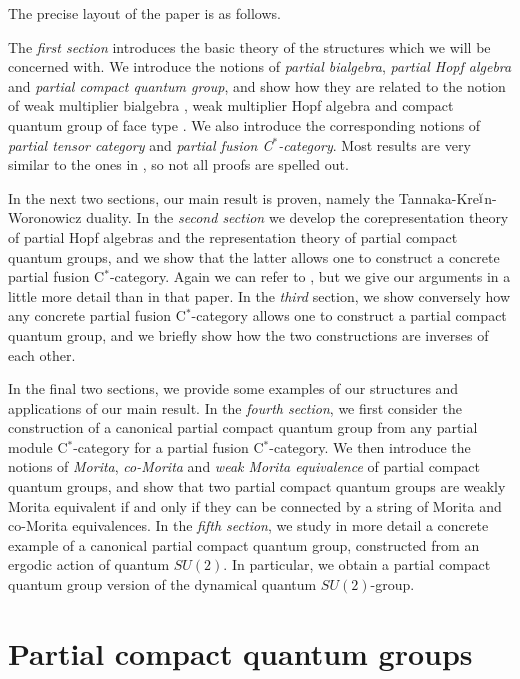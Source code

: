 \documentclass[10pt]{article}
\theoremstyle{definition}
\numberwithin{equation}{section}
\begin{document}
The precise layout of the paper is as follows.

The \emph{first section} introduces the basic theory of the structures which we will be concerned with. We introduce the notions of \emph{partial bialgebra}, \emph{partial Hopf algebra} and \emph{partial compact quantum group}, and show how they are related to the notion of weak multiplier bialgebra \cite{Boh1}, weak multiplier Hopf algebra \cite{VDW1,VDW2} and compact quantum group of face type \cite{Hay1}. We also introduce the corresponding notions of \emph{partial tensor category} and \emph{partial fusion C$^*$-category}. Most results are very similar to the ones in \cite{Hay1}, so not all proofs are spelled out.

In the next two sections, our main result is proven, namely the Tannaka-Kre$\breve{\textrm{\i}}$n-Woronowicz duality. In the \emph{second section} we develop the corepresentation theory of partial Hopf algebras and the representation theory of partial compact quantum groups, and we show that the latter allows one to construct a concrete partial fusion C$^*$-category. Again we can refer to \cite{Hay1}, but we give our arguments in a little more detail than in that paper. In the \emph{third} section, we show conversely how any concrete partial fusion C$^*$-category allows one to construct a partial compact quantum group, and we briefly show how the two constructions are inverses of each other.

In the final two sections, we provide some examples of our structures and applications of our main result. In the \emph{fourth section}, we first consider the construction of a canonical partial compact quantum group from any partial module C$^*$-category for a partial fusion C$^*$-category. We then introduce the notions of \emph{Morita}, \emph{co-Morita} and \emph{weak Morita equivalence} \cite{Mug1} of partial compact quantum groups, and show that two partial compact quantum groups are weakly Morita equivalent if and only if they can be connected by a string of Morita and co-Morita equivalences. In the \emph{fifth section}, we study in more detail a concrete example of a canonical partial compact quantum group, constructed from an ergodic action of quantum $SU(2)$. In particular, we obtain a partial compact quantum group version of the dynamical quantum $SU(2)$-group. 

\section{Partial compact quantum groups}
\end{document}
